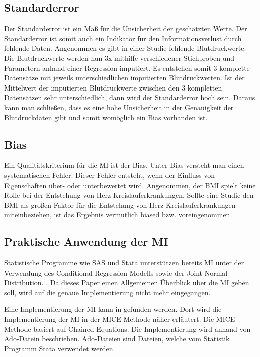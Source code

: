 \subsection{Standarderror}

Der Standarderror ist ein Maß für die Unsicherheit der 
geschätzten Werte. \autocite[1098]{Donders2006} Der Standarderror ist somit auch ein Indikator für den Informationsverlust durch fehlende Daten. \autocite[1298]{Hughes2019}
Angenommen es gibt in einer Studie fehlende Blutdruckwerte. Die Blutdruckwerte werden nun 3x mithilfe verschiedener Stichproben und Parametern anhand einer Regression imputiert.
Es entstehen somit 3 komplette Datensätze mit jeweils unterschiedlichen imputierten Blutdruckwerten. Ist der Mittelwert der imputierten Blutdruckwerte zwischen den 3 kompletten
Datensätzen sehr unterschiedlich, dann wird der Standarderror hoch sein. Daraus kann man schließen, dass es eine hohe Unsicherheit in der Genauigkeit der Blutdruckdaten gibt und
somit womöglich ein Bias vorhanden ist.   

\subsection{Bias}

Ein Qualitätskriterium für die MI ist der Bias. Unter Bias versteht man einen systematischen Fehler. Dieser Fehler entsteht, 
wenn der Einfluss von Eigenschaften über- oder unterbewertet wird. \autocite[2]{Jakobsen2017} Angenommen, der BMI 
spielt keine Rolle bei der Entstehung von Herz-Kreislauferkrankungen. Sollte eine Studie den BMI als großen Faktor 
für die Entstehung von Herz-Kreislauferkrankungen miteinbeziehen, ist das Ergebnis vermutlich biased bzw. voreingenommen.

\subsection{Praktische Anwendung der MI}

Statistische Programme wie SAS und Stata unterstützen bereits MI unter der Verwendung des Conditional Regression Modells 
sowie der Joint Normal Distribution. \autocite[164]{Lee2014}. Da dieses Paper einen Allgemeinen Überblick über die MI 
geben soll, wird auf die genaue Implementierung nicht mehr eingegangen. 

Eine Implementierung der MI kann in \textcite[]{Royston2005} gefunden werden. Dort wird die Implementierung der MI in der MICE Methode 
näher erläutert. Die MICE-Methode basiert auf Chained-Equations. Die Implementierung wird anhand von Ado-Datein beschrieben.
Ado-Dateien sind Dateien, welche vom Statistik Programm Stata verwendet werden.

